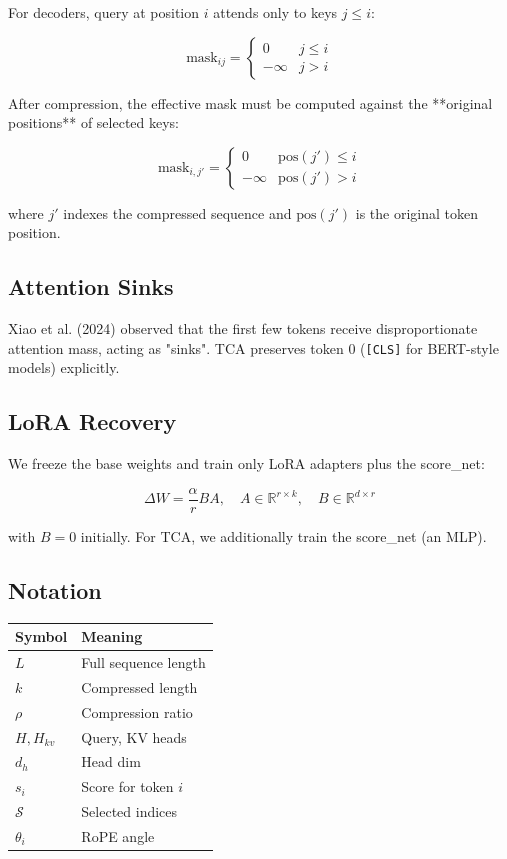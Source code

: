 For decoders, query at position $i$ attends only to keys $j \leq i$:

\[
\text{mask}_{ij} = \begin{cases} 0 & j \leq i \\ -\infty & j > i \end{cases}
\tag{3.6}
\]

After compression, the effective mask must be computed against the **original 
positions** of selected keys:

\[
\text{mask}_{i, j'} = \begin{cases} 0 & \text{pos}(j') \leq i \\ -\infty & \text{pos}(j') > i \end{cases}
\tag{3.7}
\]

where $j'$ indexes the compressed sequence and $\text{pos}(j')$ is the 
original token position.

\subsection{Attention Sinks}

Xiao et al. (2024) observed that the first few tokens receive disproportionate 
attention mass, acting as "sinks". TCA preserves token 0 (\texttt{[CLS]} for BERT-style 
models) explicitly.

\subsection{LoRA Recovery}

We freeze the base weights and train only LoRA adapters plus the score\_net:

\[
\Delta W = \frac{\alpha}{r} B A, \quad A \in \mathbb{R}^{r \times k}, \quad B \in \mathbb{R}^{d \times r}
\tag{3.8}
\]

with $B = 0$ initially. For TCA, we additionally train the score\_net (an MLP).



\subsection{Notation}

\begin{table}[H]
\centering
\small
\begin{tabular}{ll}
\toprule
\textbf{Symbol} & \textbf{Meaning} \\
\midrule
$L$ & Full sequence length \\
$k$ & Compressed length \\
$\rho$ & Compression ratio \\
$H, H_{kv}$ & Query, KV heads \\
$d_h$ & Head dim \\
$s_i$ & Score for token $i$ \\
$\mathcal{S}$ & Selected indices \\
$\theta_i$ & RoPE angle \\
\bottomrule
\end{tabular}
\end{table}

